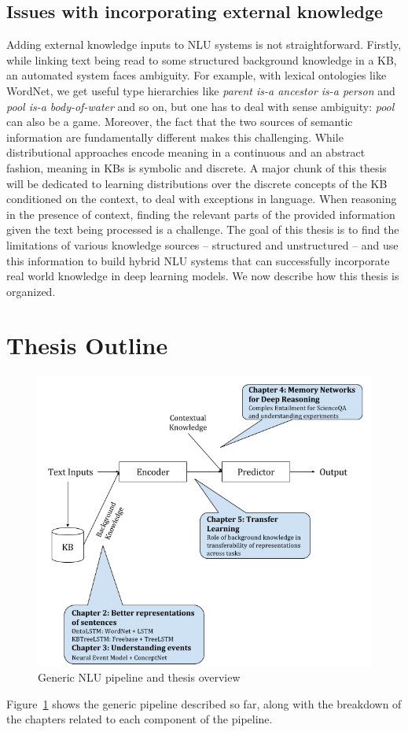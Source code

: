 \subsection{Issues with incorporating external knowledge}
Adding external knowledge inputs to NLU systems is not straightforward.  Firstly, while linking text being read to some structured background knowledge
in a KB, an automated system faces ambiguity. For example, with lexical ontologies like WordNet, 
we get useful type hierarchies like \textit{parent is-a ancestor is-a person} and \textit{pool is-a body-of-water} 
and so on, but one has to deal with sense ambiguity: \textit{pool} can also be a game. Moreover, the fact that the two sources of semantic information are fundamentally different 
makes this challenging. While distributional approaches encode meaning in a
continuous and an abstract fashion, meaning in KBs is symbolic and discrete. A major chunk of this thesis will be dedicated to learning 
distributions over the discrete concepts of the KB conditioned on the context, to deal with exceptions in language.
When reasoning in the presence of context, finding the 
relevant parts of the provided information given the text being processed is a challenge. 
The goal of this thesis is to find the limitations of various knowledge sources -- structured and unstructured -- and use this information 
to build hybrid NLU systems that can successfully incorporate real world knowledge in deep learning models. We now describe how this thesis is organized.

\section{Thesis Outline}
\begin{figure}
\begin{center}
\includegraphics[width=6in]{figures/thesis_overview.png}
\caption{Generic NLU pipeline and thesis overview}
\label{fig:thesis_overview}
\end{center}
\end{figure}
Figure~\ref{fig:thesis_overview} shows the generic pipeline described so far, along with the breakdown of the chapters related to each component
of the pipeline.

